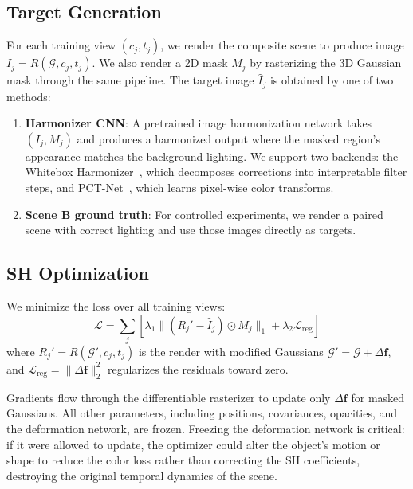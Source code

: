 \documentclass[10pt,twocolumn,letterpaper]{article}
\begin{document}
\subsection{Target Generation}

For each training view $(c_j, t_j)$, we render the composite scene to produce image $I_j = R(\mathcal{G}, c_j, t_j)$. We also render a 2D mask $M_j$ by rasterizing the 3D Gaussian mask through the same pipeline. The target image $\hat{I}_j$ is obtained by one of two methods:

\begin{enumerate}
\item \textbf{Harmonizer CNN}: A pretrained image harmonization network takes $(I_j, M_j)$ and produces a harmonized output where the masked region's appearance matches the background lighting. We support two backends: the Whitebox Harmonizer~\cite{ke2022harmonizer}, which decomposes corrections into interpretable filter steps, and PCT-Net~\cite{guerreiro2023pctnet}, which learns pixel-wise color transforms.
\item \textbf{Scene B ground truth}: For controlled experiments, we render a paired scene with correct lighting and use those images directly as targets.
\end{enumerate}

\subsection{SH Optimization}

We minimize the loss over all training views:
\begin{equation}
\mathcal{L} = \sum_j \left[ \lambda_1 \| (R_j' - \hat{I}_j) \odot M_j \|_1 + \lambda_2 \mathcal{L}_{\text{reg}} \right]
\label{eq:loss}
\end{equation}
where $R_j' = R(\mathcal{G}', c_j, t_j)$ is the render with modified Gaussians $\mathcal{G}' = \mathcal{G} + \Delta\mathbf{f}$, and $\mathcal{L}_{\text{reg}} = \|\Delta\mathbf{f}\|_2^2$ regularizes the residuals toward zero.

Gradients flow through the differentiable rasterizer to update only $\Delta\mathbf{f}$ for masked Gaussians. All other parameters, including positions, covariances, opacities, and the deformation network, are frozen. Freezing the deformation network is critical: if it were allowed to update, the optimizer could alter the object's motion or shape to reduce the color loss rather than correcting the SH coefficients, destroying the original temporal dynamics of the scene.
\end{document}
